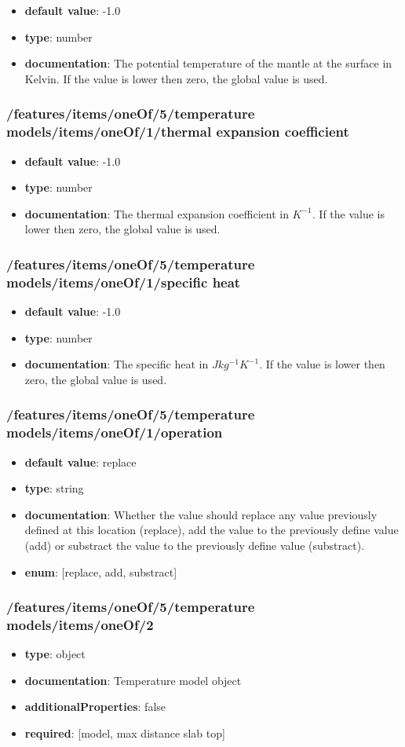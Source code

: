 \begin{itemize}\item {\bf default value}: -1.0
\item {\bf type}: number
\item {\bf documentation}: The potential temperature of the mantle at the surface in Kelvin. If the value is lower then zero, the global value is used.
\end{itemize}\subsubsection{/features/items/oneOf/5/temperature models/items/oneOf/1/thermal expansion coefficient}
\begin{itemize}\item {\bf default value}: -1.0
\item {\bf type}: number
\item {\bf documentation}: The thermal expansion coefficient in $K^{-1}$. If the value is lower then zero, the global value is used.
\end{itemize}\subsubsection{/features/items/oneOf/5/temperature models/items/oneOf/1/specific heat}
\begin{itemize}\item {\bf default value}: -1.0
\item {\bf type}: number
\item {\bf documentation}: The specific heat in $J kg^{-1} K^{-1}$. If the value is lower then zero, the global value is used.
\end{itemize}\subsubsection{/features/items/oneOf/5/temperature models/items/oneOf/1/operation}
\begin{itemize}\item {\bf default value}: replace
\item {\bf type}: string
\item {\bf documentation}: Whether the value should replace any value previously defined at this location (replace), add the value to the previously define value (add) or substract the value to the previously define value (substract).
\item {\bf enum}: [replace, add, substract]\end{itemize}\subsubsection{/features/items/oneOf/5/temperature models/items/oneOf/2}
\begin{itemize}\item {\bf type}: object
\item {\bf documentation}: Temperature model object
\item {\bf additionalProperties}: false
\item {\bf required}: [model, max distance slab top]\end{itemize}
